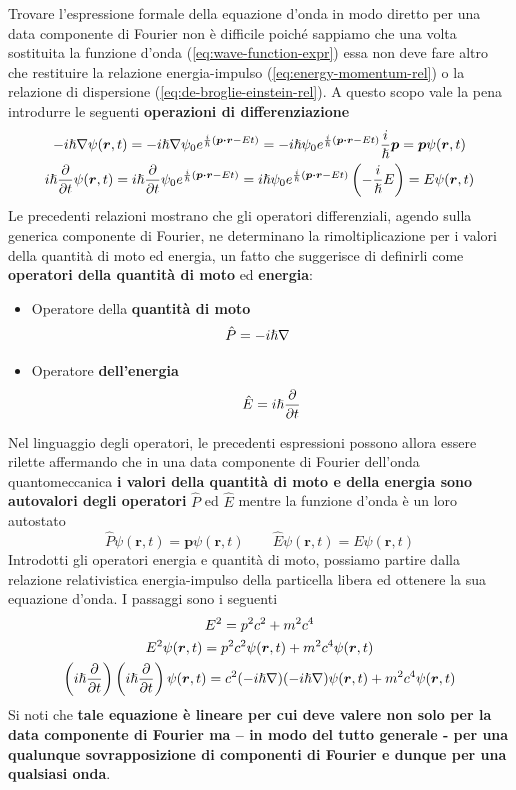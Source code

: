 Trovare l'espressione formale della equazione d'onda in modo diretto per
una data componente di Fourier non è difficile poiché sappiamo che una
volta sostituita la funzione d'onda (\ref{eq:wave-function-expr}) essa non deve fare altro
che restituire la relazione energia-impulso (\ref{eq:energy-momentum-rel}) o la relazione di
dispersione (\ref{eq:de-broglie-einstein-rel}).
A questo scopo vale la pena introdurre le seguenti \textbf{operazioni di differenziazione}
\begin{gather}
	- i \hp \nabla \psi (\bm{r},t) = - i \hp \nabla \psi_{0} e ^{\frac{i}{\hp}(\bm{p \cdot r}-E t)} =
	- i \hp \psi_{0} e^{\frac{i}{\hp}(\bm{p \cdot r}-E t)} \frac{i}{\hp} \bm{p} = \bm{p}\psi(\bm{r},t) \nonumber\\
	i \hp \frac{\partial}{\partial t} \psi (\bm{r},t) =
	i \hp \frac{\partial}{\partial t} \psi_{0} e^{\frac{i}{\hp}(\bm{p \cdot r}-E t)} =
	i \hp \psi_{0} e^{\frac{i}{\hp}(\bm{p \cdot r}-E t)} \left( - \frac{i}{\hp} E\right) = E\psi(\bm{r},t)
	\label{eq:differential-operators-qm}
\end{gather}
Le precedenti relazioni mostrano che gli operatori differenziali, agendo
sulla generica componente di Fourier, ne determinano la
rimoltiplicazione per i valori della quantità di moto ed energia, un
fatto che suggerisce di definirli come \textbf{operatori della quantità
di moto} ed \textbf{energia}:
\begin{itemize}
	\item Operatore della \textbf{quantità di moto}
	\[
	   \hat{P} = - i \hslash \nabla    \qquad
	\]
	\item Operatore \textbf{dell'energia}
	\[
		\hat{E} = i \hslash \frac{\partial}{\partial t}
	\]
\end{itemize}
Nel linguaggio degli operatori, le precedenti espressioni possono allora
essere rilette affermando che in una data componente di Fourier
dell'onda quantomeccanica \textbf{i valori della quantità di moto e
della energia sono autovalori degli operatori} \(\hat{P}\) ed
\(\hat{E}\) mentre la funzione d'onda è un loro autostato
\[
	\hat{P}\psi(\bm{r},t) = \bm{p}\psi(\bm{r},t) \qquad
	\hat{E}\psi(\bm{r},t) = E\psi(\bm{r},t)
\]
Introdotti gli operatori energia e quantità di moto, possiamo
partire dalla relazione relativistica energia-impulso della particella
libera ed ottenere la sua equazione d'onda.
I passaggi sono i seguenti
\begin{gather*}
	E^2 = p^2c^2 + m^2c^4\\
	E^2\psi(\bm{r},t) = p^2c^2\psi(\bm{r},t)+m^2c^4\psi(\bm{r},t)\\
	\left( i \hslash \frac{\partial}{\partial t}\right)\left( i \hslash \frac{\partial}{\partial t}\right)\psi(\bm{r},t) = c^2 (-i \hslash \nabla)(-i \hslash \nabla)\psi(\bm{r},t)+m^2c^4 \psi(\bm{r},t)
\end{gather*}
Si noti che \textbf{tale equazione è lineare per cui deve valere non
solo per la data componente di Fourier ma -- in modo del tutto generale
- per una qualunque sovrapposizione di componenti di Fourier e dunque
per una qualsiasi onda}.


